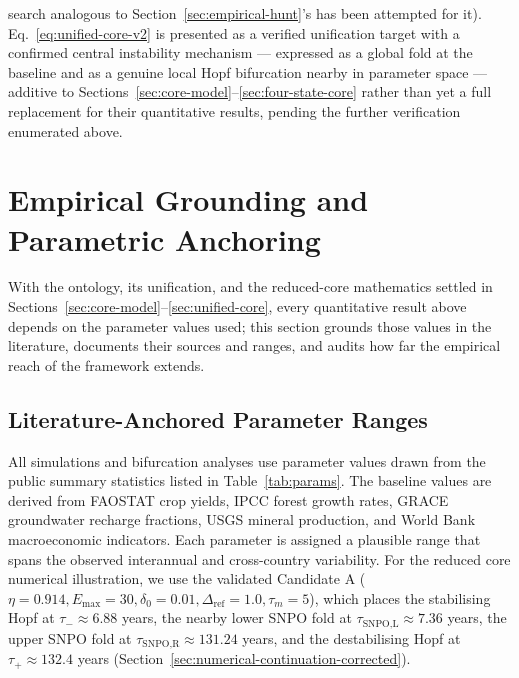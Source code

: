 \documentclass[twocolumn,10pt]{article}
\begin{document}
search analogous to Section~\ref{sec:empirical-hunt}'s has been attempted for it). Eq.~\eqref{eq:unified-core-v2} is presented as a verified unification target with a confirmed central instability mechanism --- expressed as a global fold at the baseline and as a genuine local Hopf bifurcation nearby in parameter space --- additive to Sections~\ref{sec:core-model}--\ref{sec:four-state-core} rather than yet a full replacement for their quantitative results, pending the further verification enumerated above.

\section{Empirical Grounding and Parametric Anchoring}
With the ontology, its unification, and the reduced-core mathematics settled in Sections~\ref{sec:core-model}--\ref{sec:unified-core}, every quantitative result above depends on the parameter values used; this section grounds those values in the literature, documents their sources and ranges, and audits how far the empirical reach of the framework extends.

\subsection{Literature-Anchored Parameter Ranges}
All simulations and bifurcation analyses use parameter values drawn from the public summary statistics listed in Table~\ref{tab:params}. The baseline values are derived from FAOSTAT crop yields, IPCC forest growth rates, GRACE groundwater recharge fractions, USGS mineral production, and World Bank macroeconomic indicators. Each parameter is assigned a plausible range that spans the observed interannual and cross-country variability. For the reduced core numerical illustration, we use the validated Candidate A (\(\eta = 0.914, E_{\max} = 30, \delta_0 = 0.01, \Delta_{\text{ref}} = 1.0, \tau_m = 5\)), which places the stabilising Hopf at \(\tau_- \approx 6.88\) years, the nearby lower SNPO fold at $\tau_{\text{SNPO,L}}\approx7.36$ years, the upper SNPO fold at \(\tau_{\text{SNPO,R}} \approx 131.24\) years, and the destabilising Hopf at \(\tau_+\approx132.4\) years (Section~\ref{sec:numerical-continuation-corrected}).
\end{document}
